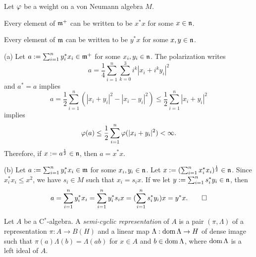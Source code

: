 \documentclass{../../small}
\begin{document}
\begin{prop}
Let $\varphi$ be a weight on a von Neumann algebra $M$.
\begin{parts}
\item Every element of $\mathfrak{m}^+$ can be written to be $x^*x$ for some $x\in\mathfrak{n}$.
\item Every element of $\mathfrak{m}$ can be written to be $y^*x$ for some $x,y\in\mathfrak{n}$.
\end{parts}
\end{prop}
\begin{pf}
(a)
Let $a:=\sum_{i=1}^ny_i^*x_i\in\mathfrak{m}^+$ for some $x_i,y_i\in\mathfrak{n}$.
The polarization writes
\[a=\frac14\sum_{i=1}^n\sum_{k=0}^3i^k|x_i+i^ky_i|^2\]
and $a^*=a$ implies
\[a=\frac12\sum_{i=1}^n(|x_i+y_i|^2-|x_i-y_i|^2)\le\frac12\sum_{i=1}^n|x_i+y_i|^2\]
implies
\[\varphi(a)\le\frac12\sum_{i=1}^n\varphi(|x_i+y_i|^2)<\infty.\]
Therefore, if $x:=a^{\frac12}\in\mathfrak{n}$, then $a=x^*x$.

(b)
Let $a:=\sum_{i=1}^ny_i^*x_i\in\mathfrak{m}$ for some $x_i,y_i\in\mathfrak{n}$.
Let $x:=(\sum_{i=1}^nx_i^*x_i)^{\frac12}\in\mathfrak{n}$.
Since $x_i^*x_i\le x^2$, we have $s_i\in M$ such that $x_i=s_ix$.
If we let $y:=\sum_{i=1}^ns_i^*y_i\in\mathfrak{n}$, then
\[a=\sum_{i=1}^ny_i^*x_i=\sum_{i=1}^ny_i^*s_ix=(\sum_{i=1}^ns_i^*y_i)x=y^*x.\qedhere\]
\end{pf}


\begin{defn}
Let $A$ be a C$^*$-algebra.
A \emph{semi-cyclic representation} of $A$ is a pair $(\pi,\Lambda)$ of a representation $\pi:A\to B(H)$ and a linear map $\Lambda:\operatorname{dom}\Lambda\to H$ of dense image such that $\pi(a)\Lambda(b)=\Lambda(ab)$ for $x\in A$ and $b\in\operatorname{dom}\Lambda$, where $\operatorname{dom}\Lambda$ is a left ideal of $A$.
\end{defn}
\end{document}

